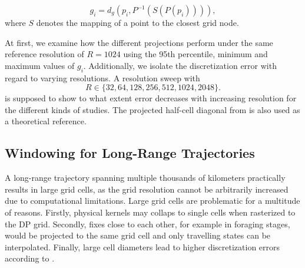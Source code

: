 \[
g_i
=
d_g
\left(
    p_i,
    P^{-1}\!\left(S(P(p_i))\right)
\right),
\]
where $S$ denotes the mapping of a point to the closest grid node.

At first, we examine how the different projections perform under the same reference resolution of $R = 1024$ using the 95th percentile, minimum and maximum values of $g_i$.
Additionally, we isolate the discretization error with regard to varying resolutions.
A resolution sweep with
\[
    R\in
    \{32,64,128,256,512,1024,2048\}.
\]
is supposed to show to what extent error decreases with increasing resolution for the different kinds of studies.
The projected half-cell diagonal from  is also used as a theoretical reference.

\subsection{Windowing for Long-Range Trajectories}
\label{subsec:projection-windowing-method}
A long-range trajectory spanning multiple thousands of kilometers practically results in large grid cells, as the grid resolution cannot
be arbitrarily increased due to computational limitations. Large grid cells are problematic for a multitude of reasons. Firstly, physical kernels
may collaps to single cells when rasterized to the DP grid.
Secondly, fixes close to each other, for example in foraging stages, would be projected to the same grid cell and only travelling states can be interpolated. Finally, 
large cell diameters lead to higher discretization errors according to . 

